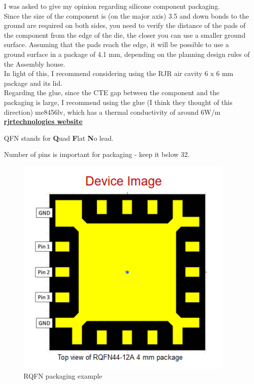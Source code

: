 \begin{info}
	I was asked to give my opinion regarding silicone component packaging.\\
	Since the size of the component is (on the major axis) 3.5 and down bonds to the ground are required on both sides, you need to verify the distance of the pads of the component from the edge of the die, the closer you can use a smaller ground surface. Assuming that the pads reach the edge, it will be possible to use a ground surface in a package of  4.1 \unit{mm}, depending on the planning design rules of the Assembly house. \\
	In light of this, I recommend considering using the RJR air cavity 6 x 6 \unit{mm} package and its lid. \\
	Regarding the glue, since the CTE gap between the component and the packaging is large, I recommend using the glue (I think they thought of this direction) me8456lv, which has a thermal conductivity of around 6W/m \\
	\href{https://www.rjrtechnologies.com/}{\textbf{rjrtechnologies website}}
\end{info}

QFN stands for \textbf{Q}uad \textbf{F}lat \textbf{N}o lead.

Number of pins is important for packaging - keep it below 32.



\begin{figure}[ht!]
	\centering %
	\includegraphics[width=0.5\linewidth]{Figures/RQFN-4-mm.png}
	\caption{RQFN packaging example }
	\label{fig:rqfn-example}
\end{figure}

